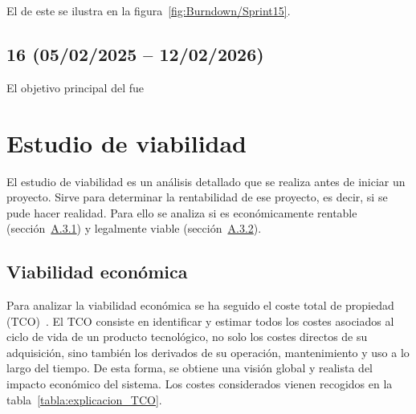 El  de este  se ilustra en la figura~\ref{fig:Burndown/Sprint15}.

\subsection{ 16 (05/02/2025 -- 12/02/2026)}
El objetivo principal del  fue

\section{Estudio de viabilidad}
El estudio de viabilidad es un análisis detallado que se realiza antes de iniciar un proyecto. Sirve para determinar la rentabilidad de ese proyecto, es decir, si se pude hacer realidad. Para ello se analiza si es económicamente rentable (sección~\hyperref[viabilidad_economica]{A.3.1}) y legalmente viable (sección~\hyperref[viabilidad_legal]{A.3.2}). 

\subsection{Viabilidad económica}\label{viabilidad_economica}
Para analizar la viabilidad económica se ha seguido el coste total de propiedad (TCO)~\cite{book:TCO_costs}. El TCO consiste en identificar y estimar todos los costes asociados al ciclo de vida de un producto tecnológico, no solo los costes directos de su adquisición, sino también los derivados de su operación, mantenimiento y uso a lo largo del tiempo. De esta forma, se obtiene una visión global y realista del impacto económico del sistema. Los costes considerados vienen recogidos en la tabla~\ref{tabla:explicacion_TCO}.

